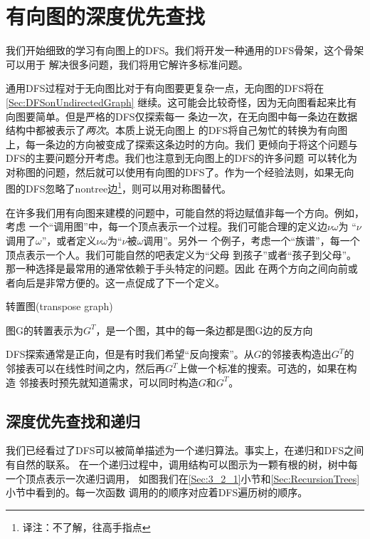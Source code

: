 \section{有向图的深度优先查找}
我们开始细致的学习有向图上的DFS。我们将开发一种通用的DFS骨架，这个骨架可以用于
解决很多问题，我们将用它解许多标准问题。

通用DFS过程对于无向图比对于有向图要更复杂一点，无向图的DFS将在\ref{Sec:DFSonUndirectedGraph}
继续。这可能会比较奇怪，因为无向图看起来比有向图要简单。但是严格的DFS仅探索每一
条边一次，在无向图中每一条边在数据结构中都被表示了\emph{两次}。本质上说无向图上
的DFS将自己匆忙的转换为有向图上，每一条边的方向被变成了探索这条边时的方向。我们
更倾向于将这个问题与DFS的主要问题分开考虑。我们也注意到无向图上的DFS的许多问题
可以转化为对称图的问题，然后就可以使用有向图的DFS了。作为一个经验法则，如果无向
图的DFS忽略了nontree边\footnote{译注：不了解，往高手指点}，则可以用对称图替代。

在许多我们用有向图来建模的问题中，可能自然的将边赋值非每一个方向。例如，考虑
一个“调用图”中，每一个顶点表示一个过程。我们可能合理的定义边$\nu\omega$为
“$\nu$调用了$\omega$”，或者定义$\nu\omega$为“$\nu$被$\omega$调用”。另外一
个例子，考虑一个“族谱”，每一个顶点表示一个人。我们可能自然的吧表定义为“父母
到孩子”或者“孩子到父母”。那一种选择是最常用的通常依赖于手头特定的问题。因此
在两个方向之间向前或者向后是非常方便的。这一点促成了下一个定义。

\begin{definition}\label{Def:TransposeGraph}
转置图(transpose graph)

图G的转置表示为$G^T$，是一个图，其中的每一条边都是图G边的反方向
\end{definition}

DFS探索通常是正向，但是有时我们希望“反向搜索”。从$G$的邻接表构造出$G^T$的
邻接表可以在线性时间之内，然后再$G^T$上做一个标准的搜索。可选的，如果在构造
邻接表时预先就知道需求，可以同时构造$G$和$G^T$。

\subsection{深度优先查找和递归}\label{Sec:Depth-firstSearchandRecursive}
我们已经看过了DFS可以被简单描述为一个递归算法。事实上，在递归和DFS之间有自然的联系。
在一个递归过程中，调用结构可以图示为一颗有根的树，树中每一个顶点表示一次递归调用，
如图我们在\ref{Sec:3_2_1}小节和\ref{Sec:RecursionTrees}小节中看到的。每一次函数
调用的的顺序对应着DFS遍历树的顺序。


